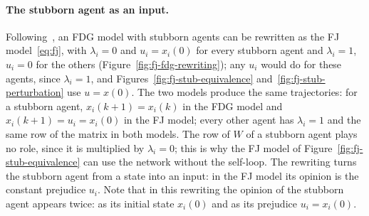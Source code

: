 \paragraph{The stubborn agent as an input.}
Following~\cite{proskurnikov2017tutorial}, an FDG model with stubborn agents can be
rewritten as the FJ model~\eqref{eq:fj}, with $\lambda_i = 0$ and $u_i = x_i(0)$ for
every stubborn agent and $\lambda_i = 1$, $u_i = 0$ for the others
(Figure~\ref{fig:fj-fdg-rewriting}); any $u_i$ would do for these agents, since
$\lambda_i = 1$, and Figures~\ref{fig:fj-stub-equivalence}
and~\ref{fig:fj-stub-perturbation} use $u = x(0)$. The two models
produce the same trajectories: for a stubborn agent, $x_i(k+1) = x_i(k)$ in the FDG
model and $x_i(k+1) = u_i = x_i(0)$ in the FJ model; every other agent has
$\lambda_i = 1$ and the same row of the matrix in both models. The row of $W$ of a
stubborn agent plays no role, since it is multiplied by $\lambda_i = 0$; this is why
the FJ model of Figure~\ref{fig:fj-stub-equivalence} can use the network without the
self-loop. The rewriting turns the stubborn agent from a state into an input: in the FJ
model its opinion is the constant prejudice $u_i$. Note that in this rewriting the
opinion of the stubborn agent appears twice: as its initial state $x_i(0)$ and as its
prejudice $u_i = x_i(0)$.

